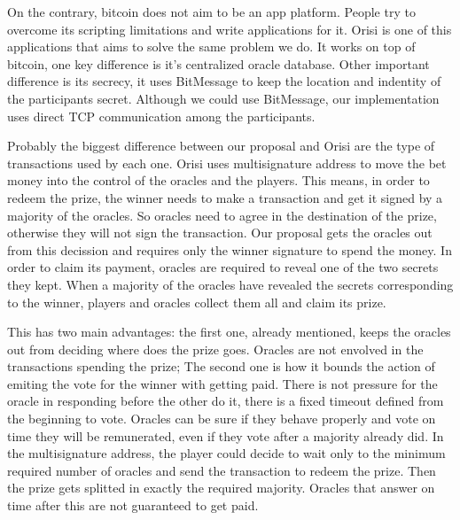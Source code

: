 On the contrary, bitcoin does not aim to be an app platform.
People try to overcome its scripting limitations and write applications for it.
Orisi is one of this applications that aims to solve the same problem we do.
It works on top of bitcoin, one key difference is it's centralized oracle
  database.
Other important difference is its secrecy, it uses BitMessage to keep the
  location and indentity of the participants secret.
Although we could use BitMessage, our implementation uses direct TCP
  communication among the participants.

Probably the biggest difference between our proposal and Orisi are the type of
  transactions used by each one.
Orisi uses multisignature address to move the bet money into the control of
  the oracles and the players.
This means, in order to redeem the prize, the winner needs to make a transaction
  and get it signed by a majority of the oracles.
So oracles need to agree in the destination of the prize, otherwise they will
  not sign the transaction.
Our proposal gets the oracles out from this decission and requires only the
  winner signature to spend the money.
In order to claim its payment, oracles are required to reveal one of the two
  secrets they kept.
When a majority of the oracles have revealed the secrets corresponding to the
  winner, players and oracles collect them all and claim its prize.

This has two main advantages: the first one, already mentioned, keeps the
  oracles out from deciding where does the prize goes.
Oracles are not envolved in the transactions spending the prize;
The second one is how it bounds the action of emiting the vote for the winner
  with getting paid.
There is not pressure for the oracle in responding before the other do it,
  there is a fixed timeout defined from the beginning to vote.
Oracles can be sure if they behave properly and vote on time they will be
  remunerated, even if they vote after a majority already did.
In the multisignature address, the player could decide to wait only to the
  minimum required number of oracles and send the transaction to redeem the
  prize.
Then the prize gets splitted in exactly the required majority.
Oracles that answer on time after this are not guaranteed to get paid.
